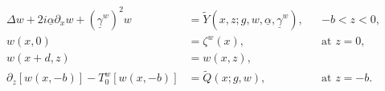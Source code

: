 \begin{subequations}
\begin{align}
\Delta w +2i\underline{\alpha}\partial_{x}w+(\underline{\gamma}^w)^2w&=\tilde{Y}\left(x,z;g,w,\underline{\alpha},\underline{\gamma}^w\right),&& \text{$-b<z<0$}, \\
w(x,0)&=\zeta^w(x),&&\text{at $z=0$},\\
w(x+d,z)&=w(x,z), \\
\partial_z \left[w(x,-b)\right] - T_0^w[w(x,-b)]&=\tilde{Q}(x;g,w),&&\text{at $z=-b$}. 
\end{align}
\end{subequations}
